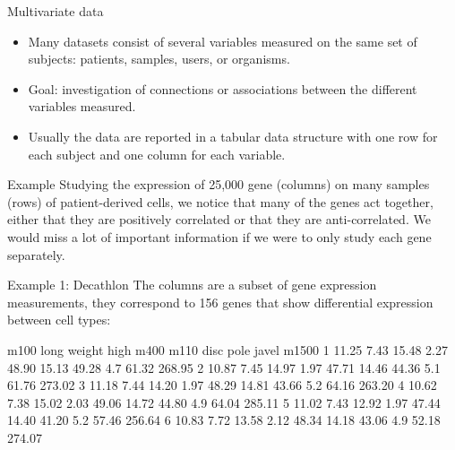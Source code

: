 \documentclass[11pt,handout,aspectratio=169]{beamer}
\begin{document}
\begin{frame}{Multivariate data}
	\begin{itemize}
		\item Many datasets consist of several variables measured on the same set of subjects: patients, samples, users, or organisms.
		\item Goal: investigation of connections or associations between the different variables measured.
		\item Usually the data are reported in a tabular data structure with one row for each subject and one column for each variable.  
	\end{itemize}
	\begin{exampleblock}{Example}
	Studying the expression of 25{,}000 gene (columns) on many samples (rows) of patient-derived cells, we notice that many of the genes act together, either that they are positively correlated or that they are anti-correlated. We would miss a lot of important information if we were to only study each gene separately.	
	\end{exampleblock}
\end{frame}

\begin{frame}[fragile]{Example 1: Decathlon}
The columns are a subset of gene expression measurements, they correspond to 156 genes that show differential expression between cell types:
\scriptsize
\begin{Schunk}
\begin{Soutput}
   m100 long weight high  m400  m110  disc pole javel  m1500
1 11.25 7.43  15.48 2.27 48.90 15.13 49.28  4.7 61.32 268.95
2 10.87 7.45  14.97 1.97 47.71 14.46 44.36  5.1 61.76 273.02
3 11.18 7.44  14.20 1.97 48.29 14.81 43.66  5.2 64.16 263.20
4 10.62 7.38  15.02 2.03 49.06 14.72 44.80  4.9 64.04 285.11
5 11.02 7.43  12.92 1.97 47.44 14.40 41.20  5.2 57.46 256.64
6 10.83 7.72  13.58 2.12 48.34 14.18 43.06  4.9 52.18 274.07
\end{Soutput}
\end{Schunk}
\end{frame}
\end{document}

